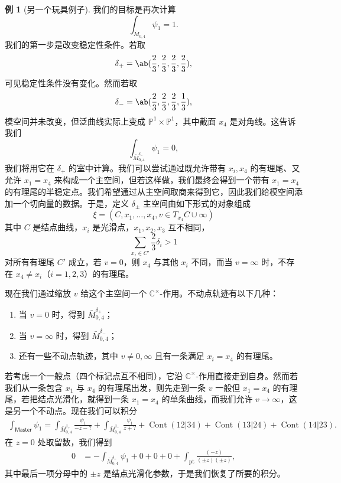 \documentclass{amsart}
\theoremstyle{definition}
\newtheorem{exm}[thm]{例}
\theoremstyle{remark}
\theoremstyle{plain}
\theoremstyle{definition}
\theoremstyle{remark}
\newcommand{\C}{\mathbb{C}}
\renewcommand{\P}{\mathbb{P}}
\newcommand{\mr}[1]{\mathrm{#1}}
\newcommand{\on}[1]{\operatorname{#1}}
\newcommand{\ms}[1]{\mathsf{#1}}
\newcommand{\1}{\mathbf{1}}
\newcommand{\2}{\mathbf{2}}
\newcommand{\3}{\mathbf{3}}
\begin{document}
\begin{exm}[另一个玩具例子]
    我们的目标是再次计算
    \[ \int_{\bar{M}_{0,4}} \psi_1 = 1. \]
    我们的第一步是改变稳定性条件。若取
    \[ \delta_+ = \ab(\frac{2}{3}, \frac{2}{3}, \frac{2}{3}, \frac{2}{3}), \]
    可见稳定性条件没有变化。然而若取
    \[ \delta_- = \ab(\frac{2}{3}, \frac{2}{3}, \frac{2}{3}, \frac{1}{3}), \]
    模空间并未改变，但泛曲线实际上变成 \(\P^1 \times \P^1\)，其中截面 \(x_4\) 是对角线。这告诉我们
    \[ \int_{\bar{M}_{0,4}^{\delta_-}} \psi_1 = 0, \]
    我们将用它在 \(\delta_+\) 的室中计算。我们可以尝试通过既允许带有 \(x_i, x_4\) 的有理尾、又允许 \(x_1 = x_4\) 来构成一个主空间，但若这样做，我们最终会得到一个带有 \(x_1 = x_4\) 的有理尾的半稳定点。我们希望通过从主空间取商来得到它，因此我们给模空间添加一个切向量的数据。于是，定义 \(\delta_{\pm}\) 主空间由如下形式的对象组成
    \[ \xi = (C, x_1, \ldots, x_4, v \in T_{x_4} C \cup \infty) \]
    其中 \(C\) 是结点曲线，\(x_i\) 是光滑点，\(x_1, x_2, x_3\) 互不相同，
    \[ \sum_{x_i \in C'} \frac{2}{3} \delta_i > 1 \]
    对所有有理尾 \(C'\) 成立，若 \(v = 0\)，则 \(x_4\) 与其他 \(x_i\) 不同，而当 \(v = \infty\) 时，不存在 \(x_4 \neq x_i\)（\(i = 1,2,3\)）的有理尾。

    现在我们通过缩放 \(v\) 给这个主空间一个 \(\C^{\times}\)-作用。不动点轨迹有以下几种：
    \begin{enumerate}
        \item 当 \(v = 0\) 时，得到 \(\bar{M}_{0,4}^{\delta_+}\)；
        \item 当 \(v = \infty\) 时，得到 \(\bar{M}_{0,4}^{\delta_-}\)；
        \item 还有一些不动点轨迹，其中 \(v \neq 0,\infty\) 且有一条满足 \(x_i = x_4\) 的有理尾。
    \end{enumerate}

    若考虑一个一般点（四个标记点互不相同），它沿 \(\C^{\times}\)-作用直接走到自身。然而若我们从一条包含 \(x_1\) 与 \(x_4\) 的有理尾出发，则先走到一条 \(v\) 一般但 \(x_1 = x_4\) 的有理尾，若把结点光滑化，就得到一条 \(x_1 = x_4\) 的单条曲线，而我们允许 \(v \to \infty\)，这是另一个不动点。现在我们可以积分
    \begin{align*}
        \int_{\ms{Master}} \psi_1 = \int_{\bar{M}_{0,4}^{\delta_+}} \frac{\psi_1}{-z-?} + \int_{\bar{M}_{0,4}^{\delta_-}} \frac{\psi_1}{z+?} + \on{Cont}(12|34) + \on{Cont}(13|24) + \on{Cont}(14|23).
    \end{align*}
    在 \(z = 0\) 处取留数，我们得到
    \begin{align*}
        0 &= - \int_{\bar{M}_{0,4}^{\delta_+}} \psi_1 + 0 + 0 + 0 + \int_{\mr{pt}} \frac{(-z)}{(\pm z)(\pm z)},
    \end{align*}
    其中最后一项分母中的 \(\pm z\) 是结点光滑化参数，于是我们恢复了所要的积分。
\end{exm}
\end{document}
